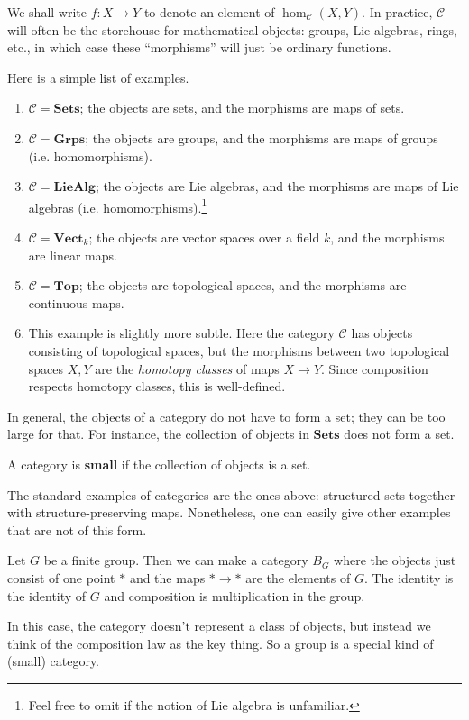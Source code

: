 We shall write $f: X \to Y$ to denote an element of $\hom_{\mathcal{C}}(X, Y)$.
In practice, $\mathcal{C}$ will often be the storehouse for mathematical objects: groups, Lie algebras,
rings, etc., in which case these ``morphisms'' will just be ordinary functions.

Here is a simple list of examples.
\begin{example}
\begin{enumerate}
\item $\mathcal{C}  = \mathbf{Sets}$; the objects are sets, and the morphisms
are maps of sets.
\item $\mathcal{C} = \mathbf{Grps}$; the objects are groups, and the morphisms
are maps of groups (i.e. homomorphisms).
\item $\mathcal{C} = \mathbf{LieAlg}$; the objects are Lie algebras, and the
morphisms are maps of Lie algebras (i.e. homomorphisms).\footnote{Feel free to
omit if the notion of Lie algebra is unfamiliar.}
\item  $\mathcal{C} = \mathbf{Vect}_k$; the objects are vector spaces over a
field $k$, and the morphisms are linear maps.
\item $\mathcal{C} = \mathbf{Top}$; the objects are topological spaces, and the
morphisms are continuous maps.
\item  This example is slightly more subtle. Here the category $\mathcal{C}$
has objects consisting of topological spaces, but the morphisms between two
topological spaces $X,Y$ are the \emph{homotopy classes} of maps $X \to Y$.
Since composition respects homotopy classes, this is well-defined.
\end{enumerate}
\end{example}



In general, the objects of a category do not have to form a set; they can
be too large for
that.
For instance, the collection of objects in $\mathbf{Sets}$ does not form a set.


\begin{definition}
A category is \textbf{small} if the collection of objects is a set.
\end{definition}

The standard examples of categories are the ones above: structured sets
together with structure-preserving maps. Nonetheless, one can easily give
other examples that are not of this form.

\begin{example} \label{BG}
Let $G$ be a finite group. Then we can make a category $B_G$ where the objects
just consist of one point $\ast$ and the maps $\ast \to \ast$ are the elements
of $G$. The identity is the identity of $G$ and composition is multiplication
in the group.

In this case, the category doesn't represent  a class of objects, but
instead we think of the composition law as the key thing. So a group is a
special kind of (small) category.
\end{example}

